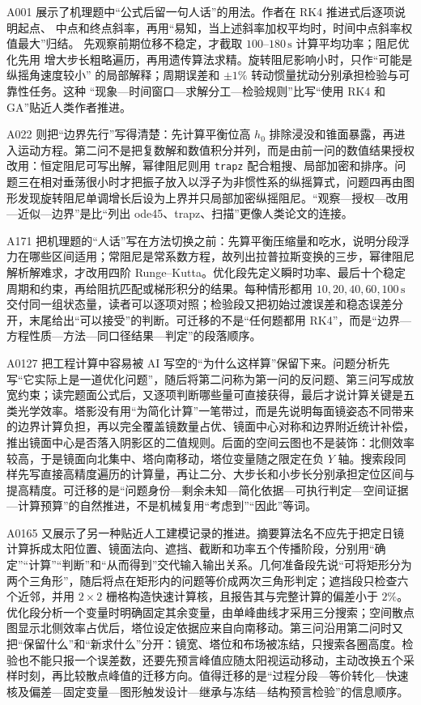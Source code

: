 A001 展示了机理题中“公式后留一句人话”的用法。作者在 RK4 推进式后逐项说明起点、
中点和终点斜率，再用“易知，当上述斜率加权平均时，时间中点斜率权值最大”归结。
先观察前期位移不稳定，才截取 $100$--$180\,\mathrm{s}$ 计算平均功率；阻尼优化先用
增大步长粗略遍历，再用遗传算法求精。旋转阻尼影响小时，只作“可能是纵摇角速度较小”
的局部解释；周期误差和 $\pm1\%$ 转动惯量扰动分别承担检验与可靠性任务。这种
“现象—时间窗口—求解分工—检验规则”比写“使用 RK4 和 GA”贴近人类作者推进。

A022 则把“边界先行”写得清楚：先计算平衡位高 $h_0$ 排除浸没和锥面暴露，再进入运动方程。第二问不是把复数解和数值积分并列，而是由前一问的数值结果授权改用：恒定阻尼可写出解，幂律阻尼则用 \texttt{trapz} 配合粗搜、局部加密和排序。问题三在相对垂荡很小时才把振子放入以浮子为非惯性系的纵摇算式，问题四再由图形发现旋转阻尼单调增长后设为上界并只局部加密纵摇阻尼。“观察—授权—改用—近似—边界”是比“列出 ode45、trapz、扫描”更像人类论文的连接。

A171 把机理题的“人话”写在方法切换之前：先算平衡压缩量和吃水，说明分段浮力在哪些区间适用；常阻尼是常系数方程，故列出拉普拉斯变换的三步，幂律阻尼解析解难求，才改用四阶 Runge--Kutta。优化段先定义瞬时功率、最后十个稳定周期和约束，再给阻抗匹配或梯形积分的结果。每种情形都用 $10,20,40,60,100\,\mathrm{s}$ 交付同一组状态量，读者可以逐项对照；检验段又把初始过渡误差和稳态误差分开，末尾给出“可以接受”的判断。可迁移的不是“任何题都用 RK4”，而是“边界—方程性质—方法—同口径结果—判定”的段落顺序。

A0127 把工程计算中容易被 AI 写空的“为什么这样算”保留下来。问题分析先写“它实际上是一道优化问题”，随后将第二问称为第一问的反问题、第三问写成放宽约束；读完题面公式后，又逐项判断哪些量可直接获得，最后才说计算关键是五类光学效率。塔影没有用“为简化计算”一笔带过，而是先说明每面镜姿态不同带来的边界计算负担，再以完全覆盖镜数量占优、镜面中心对称和边界附近统计补偿，推出镜面中心是否落入阴影区的二值规则。后面的空间云图也不是装饰：北侧效率较高，于是镜面向北集中、塔向南移动，塔位变量随之限定在负 $Y$ 轴。搜索段同样先写直接高精度遍历的计算量，再让二分、大步长和小步长分别承担定位区间与提高精度。可迁移的是“问题身份—剩余未知—简化依据—可执行判定—空间证据—计算预算”的自然推进，不是机械复用“考虑到”“因此”等词。

A0165 又展示了另一种贴近人工建模记录的推进。摘要算法名不应先于把定日镜计算拆成太阳位置、镜面法向、遮挡、截断和功率五个传播阶段，分别用“确定”“计算”“判断”和“从而得到”交代输入输出关系。几何准备段先说“可将矩形分为两个三角形”，随后将点在矩形内的问题等价成两次三角形判定；遮挡段只检查六个近邻，并用 $2\times2$ 栅格构造快速计算核，且报告其与完整计算的偏差小于 $2\%$。优化段分析一个变量时明确固定其余变量，由单峰曲线才采用三分搜索；空间散点图显示北侧效率占优后，塔位设定依据应来自向南移动。第三问沿用第二问时又把“保留什么”和“新求什么”分开：镜宽、塔位和布场被冻结，只搜索各圈高度。检验也不能只报一个误差数，还要先预言峰值应随太阳视运动移动，主动改换五个采样时刻，再比较散点峰值的迁移方向。值得迁移的是“过程分段—等价转化—快速核及偏差—固定变量—图形触发设计—继承与冻结—结构预言检验”的信息顺序。

